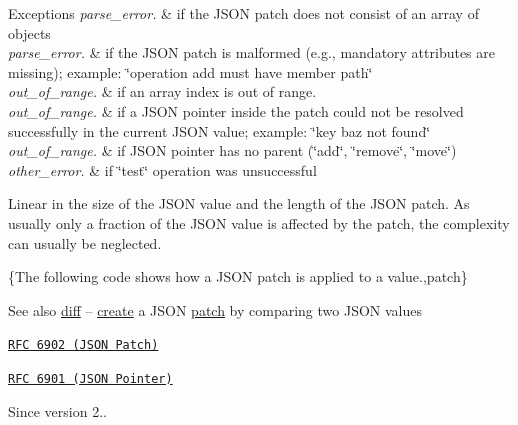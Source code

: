 \begin{DoxyExceptions}{Exceptions}
{\em parse\+\_\+error.} & if the J\+S\+ON patch does not consist of an array of objects\\
\hline
{\em parse\+\_\+error.} & if the J\+S\+ON patch is malformed (e.\+g., mandatory attributes are missing); example\+: {\ttfamily \char`\"{}operation add must have member path\char`\"{}}\\
\hline
{\em out\+\_\+of\+\_\+range.} & if an array index is out of range.\\
\hline
{\em out\+\_\+of\+\_\+range.} & if a J\+S\+ON pointer inside the patch could not be resolved successfully in the current J\+S\+ON value; example\+: {\ttfamily \char`\"{}key baz not
found\char`\"{}}\\
\hline
{\em out\+\_\+of\+\_\+range.} & if J\+S\+ON pointer has no parent (\char`\"{}add\char`\"{}, \char`\"{}remove\char`\"{}, \char`\"{}move\char`\"{})\\
\hline
{\em other\+\_\+error.} & if \char`\"{}test\char`\"{} operation was unsuccessful\\
\hline
\end{DoxyExceptions}
Linear in the size of the J\+S\+ON value and the length of the J\+S\+ON patch. As usually only a fraction of the J\+S\+ON value is affected by the patch, the complexity can usually be neglected.

\{The following code shows how a J\+S\+ON patch is applied to a value.,patch\}

\begin{DoxySeeAlso}{See also}
\hyperlink{classnlohmann_1_1basic__json_a1c1f21327df91a4dd6c5f5a107240385}{diff} -- \hyperlink{classnlohmann_1_1basic__json_a49cba7a0d3a355161e2b62b437b80936}{create} a J\+S\+ON \hyperlink{classnlohmann_1_1basic__json_a9c2abd53796bb301f57185e0a81b352a}{patch} by comparing two J\+S\+ON values

\href{https://tools.ietf.org/html/rfc6902}{\tt R\+FC 6902 (J\+S\+ON Patch)} 

\href{https://tools.ietf.org/html/rfc6901}{\tt R\+FC 6901 (J\+S\+ON Pointer)}
\end{DoxySeeAlso}
\begin{DoxySince}{Since}
version 2.. 
\end{DoxySince}
